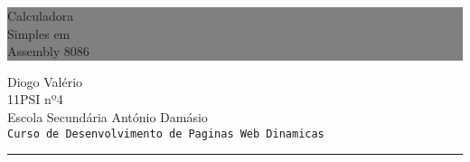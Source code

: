 \documentclass[12pt]{article}
\begin{document}
\begin{titlepage}

	\colorbox{grey}{
		\parbox[t]{0.93\textwidth}{ %
			\parbox[t]{0.91\textwidth}{ %
				\raggedleft
				\fontsize{50pt}{80pt}\selectfont 
				\vspace{0.7cm} 

				Calculadora\\
				Simples em\\
				Assembly 8086\\

				\vspace{0.7cm}
			}
		}
	}
	\vfill

	\parbox[t]{0.93\textwidth}{ 
		\raggedleft 
		\large 
		{\Large Diogo Valério}\\[4pt]
		11PSI nº4\\
		Escola Secundária António Damásio\\[4pt] 
		\texttt{Curso de Desenvolvimento de Paginas Web Dinamicas}\\

		\hfill\rule{0.6\linewidth}{1pt}
	}
\end{titlepage}


\tableofcontents
\newpage
\end{document}
